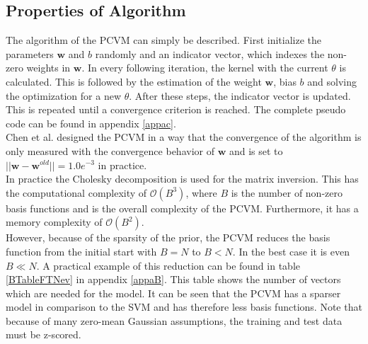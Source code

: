 \subsection{Properties of Algorithm}\label{PcSubSecAlgo}
The algorithm of the \acs{PCVM} can simply be described.
First initialize the parameters $\mathbf{w}$ and $b$ randomly and an indicator vector, which indexes the non-zero weights in $\mathbf{w}$.
In every following iteration, the kernel with the current $\theta$ is calculated.
This is followed by the estimation of the weight $\mathbf{w}$, bias $b$ and solving the optimization for a new $\theta$. After these steps, the indicator vector is updated.
This is repeated until a convergence criterion is reached.\cite{Chen.2009}
The complete pseudo code can be found in appendix \ref{appac}.\\
Chen et al. designed the \acs{PCVM} in a way that the convergence of the algorithm is only measured with the convergence behavior of $\mathbf{w}$ and is set to $||{\mathbf{w}-\mathbf{w}^{old}}|| = 1.0e^{-3}$ in practice.\\
In practice the Cholesky decomposition is used for the matrix inversion. 
This has the computational complexity of $\mathcal{O}(B^3)$, where $B$ is the number of non-zero basis functions and is the overall complexity of the \acs{PCVM}. Furthermore, it has a memory complexity of $\mathcal{O}(B^2)$.\cite{Chen.2009}\\
However, because of the sparsity of the prior, the \acs{PCVM} reduces the basis function from the initial start with $B = N$ to $B < N$.\cite{Chen.2009}
In the best case it is even $B \ll N$.
A practical example of this reduction can be found in table \ref{BTableFTNev} in appendix \ref{appaB}. 
This table shows the number of vectors which are needed for the model. 
It can be seen that the \acs{PCVM} has a sparser model in comparison to the \acs{SVM} and has therefore less basis functions.
Note that because of many zero-mean Gaussian assumptions, the training and test data must be z-scored. 
